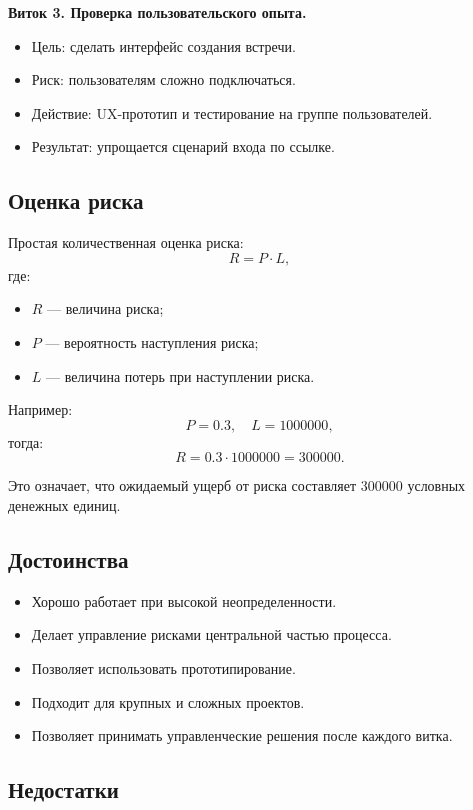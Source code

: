 \documentclass[12pt,a4paper]{article}
\begin{document}
\textbf{Виток 3. Проверка пользовательского опыта.}
\begin{itemize}
    \item Цель: сделать интерфейс создания встречи.
    \item Риск: пользователям сложно подключаться.
    \item Действие: UX-прототип и тестирование на группе пользователей.
    \item Результат: упрощается сценарий входа по ссылке.
\end{itemize}

\subsection{Оценка риска}

Простая количественная оценка риска:
\[
R = P \cdot L,
\]
где:
\begin{itemize}
    \item $R$ --- величина риска;
    \item $P$ --- вероятность наступления риска;
    \item $L$ --- величина потерь при наступлении риска.
\end{itemize}

Например:
\[
P = 0.3,\quad L = 1000000,
\]
тогда:
\[
R = 0.3 \cdot 1000000 = 300000.
\]

Это означает, что ожидаемый ущерб от риска составляет $300000$ условных денежных единиц.

\subsection{Достоинства}

\begin{itemize}
    \item Хорошо работает при высокой неопределенности.
    \item Делает управление рисками центральной частью процесса.
    \item Позволяет использовать прототипирование.
    \item Подходит для крупных и сложных проектов.
    \item Позволяет принимать управленческие решения после каждого витка.
\end{itemize}

\subsection{Недостатки}
\end{document}
